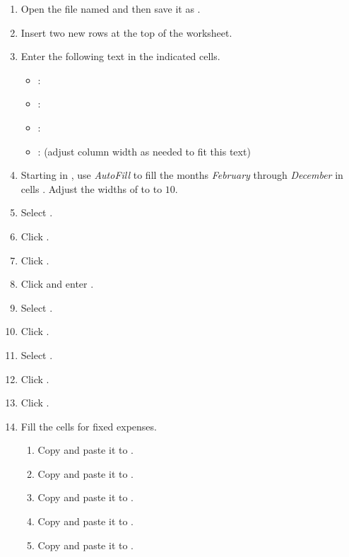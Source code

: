 \begin{enumbox}
	\begin{enumerate}
		\item Open the file named  and then save it as .
		\item Insert two new rows at the top of the worksheet.
		\item Enter the following text in the indicated cells.
	
	\begin{itemize}
		\item {}: 
		\item {}: 
		\item {}: 
		\item {}:  (adjust column width as needed to fit this text)
	\end{itemize}
	
		\item Starting in , use \textit{AutoFill} to fill the months \textit{February} through \textit{December} in cells . Adjust the widths of  to  to $ 10 $.
		\item Select .
		\item Click .
		\item Click . 
		\item Click  and enter . 
		\item Select .
		\item Click .
		\item Select .
		\item Click .
		\item Click . 
	
		\item Fill the cells for fixed expenses.
		\begin{enumerate}
			\item Copy  and paste it to .
			\item Copy  and paste it to .
			\item Copy  and paste it to .
			\item Copy  and paste it to .
			\item Copy  and paste it to .
		\end{enumerate}	
		

\end{enumerate}
\end{enumbox}

